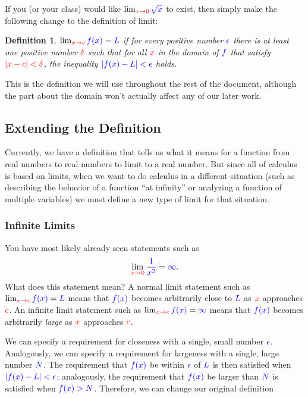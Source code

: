 \documentclass{myarticle}
\newcommand{\hor}[1]{\textcolor{red}{#1}} %
\newcommand{\ver}[1]{\textcolor{blue}{#1}}
\theoremstyle{nospace}
\newtheorem*{oldattempt}{Definition}
\newenvironment{attempt}{\begin{mdframed}\begin{oldattempt}}{\end{oldattempt}\end{mdframed}}
\newtheorem{old series theorem}{Theorem}
\newenvironment{series theorem}{\begin{mdframed}\begin{old series theorem}}{\end{old series theorem}\end{mdframed}}
\begin{document}
If you (or your class) would like $\lim_{\hor{x \to 0}} \ver{\sqrt{x}}$ to exist, then simply make the following change to the definition of limit:

\begin{attempt} $\lim_{\hor{x \to c}} \ver{f(x)} = \ver{L}$ if for every positive number $\ver{\epsilon}$ there is at least one positive number $\hor{\delta}$ such that for all $\hor{x}$ in the domain of $\ver{f}$ that satisfy $\hor{|x - c| < \delta}$, the inequality $\ver{|f(x) - L| < \epsilon}$ holds. \end{attempt}

This is the definition we will use throughout the rest of the document, although the part about the domain won't actually affect any of our later work.

\subsection{Extending the Definition} \label{sec:extending limit definition}

Currently, we have a definition that tells us what it means for a function from real numbers to real numbers to limit to a real number. But since all of calculus is based on limits, when we want to do calculus in a different situation (such as describing the behavior of a function ``at infinity'' or analyzing a function of multiple variables) we must define a new type of limit for that situation.

\subsubsection{Infinite Limits} \label{sec:infinite limits}

You have most likely already seen statements such as \[ \lim_{\hor{x \to 0}} \ver{\frac{1}{x^2}} = \ver{\infty}. \] What does this statement mean? A normal limit statement such as $\lim_{\hor{x \to c}} \ver{f(x)} = \ver{L}$ means that $\ver{f(x)}$ becomes arbitrarily close to $\ver{L}$ as $\hor{x}$ approaches $\hor{c}$. An infinite limit statement such as $\lim_{\hor{x \to c}} \ver{f(x)} = \ver{\infty}$ means that $\ver{f(x)}$ becomes arbitrarily \emph{large} as $\hor{x}$ approaches $\hor{c}$.

We can specify a requirement for closeness with a single, small number $\ver{\epsilon}$. Analogously, we can specify a requirement for largeness with a single, large number $\ver{N}$. The requirement that $\ver{f(x)}$ be within $\ver{\epsilon}$ of $\ver{L}$ is then satisfied when $\ver{|f(x) - L| < \epsilon}$; analogously, the requirement that $\ver{f(x)}$ be larger than $\ver{N}$ is satisfied when $\ver{f(x) > N}$. Therefore, we can change our original definition
\end{document}
